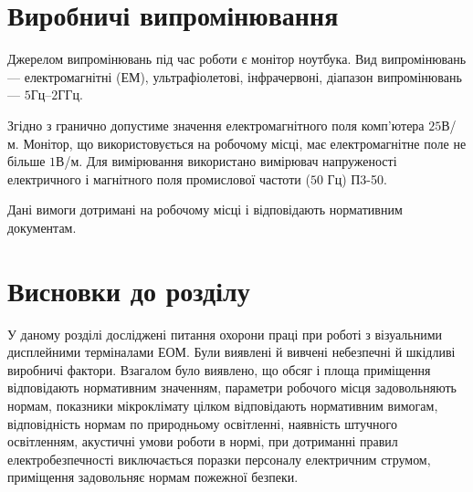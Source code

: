 \section{Виробничі випромінювання}

Джерелом випромінювань під час роботи є монітор ноутбука. 
Вид випромінювань --- електромагнітні (ЕМ), ультрафіолетові, інфрачервоні,
діапазон випромінювань --- $5$Гц–$2$ГГц.

Згідно з \cite{DSN} гранично допустиме значення електромагнітного поля
комп’ютера $25$В/м.
Монітор, що використовується на робочому місці, має електромагнітне поле
не більше $1$В/м.
Для вимірювання використано вимірювач напруженості електричного
і магнітного поля промислової частоти ($50$ Гц) П3-50.

Дані вимоги дотримані на робочому місці і відповідають нормативним документам.

\section*{Висновки до розділу }

У даному розділі досліджені питання охорони праці при роботі з візуальними
дисплейними терміналами ЕОМ.
Були виявлені й вивчені небезпечні й шкідливі виробничі фактори.
Взагалом було виявлено, що
обсяг і площа приміщення  відповідають нормативним значенням,
параметри робочого місця задовольняють нормам,
показники мікроклімату цілком відповідають нормативним вимогам,
відповідність нормам по природньому освітленні, наявність штучного освітленням,
акустичні умови роботи в нормі,
при дотриманні правил електробезпечності виключається поразки персоналу
електричним струмом,
приміщення задовольняє нормам пожежної безпеки.

